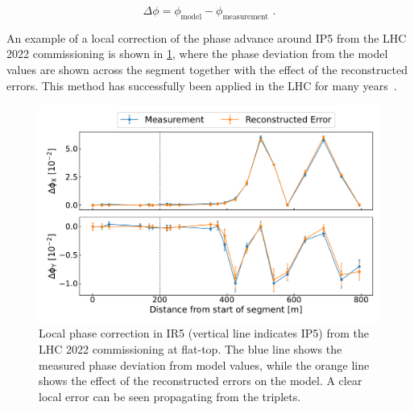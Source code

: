 \begin{equation}
  \Delta \phi = \phi_{\mathrm{model}} - \phi_{\mathrm{measurement}} \text{ .}
  \label{equation:sbs_delta_phi}
\end{equation}

An example of a local correction of the phase advance around IP\num{5} from the LHC \num{2022} commissioning is shown in \cref{figure:example_sbs_correction}, where the phase deviation from the model values are shown across the segment together with the effect of the reconstructed errors.
This method has successfully been applied in the LHC for many years~\cite{PRAB:Aiba:First_Beating_Measurement_LHC,PRAB:Tomas:Record_Low_Beta_Beating_in_the_LHC,PRAB:Persson:LHC_Optics_Commissioning_OnePercent}.

\begin{figure}[!hbt]
  \centering
  \includegraphics*[width=0.99\linewidth]{Figures/Optics_Measurements_Corrections_at_LHC/sbs_phase_ip5_example.pdf}
  \caption{Local phase correction in IR\num{5} (vertical line indicates IP\num{5}) from the LHC \num{2022} commissioning at flat-top. The \textcolor{mplblue}{blue} line shows the measured phase deviation from model values, while the \textcolor{mplorange}{orange} line shows the effect of the reconstructed errors on the model. A clear local error can be seen propagating from the triplets.}
  \label{figure:example_sbs_correction}
\end{figure}

